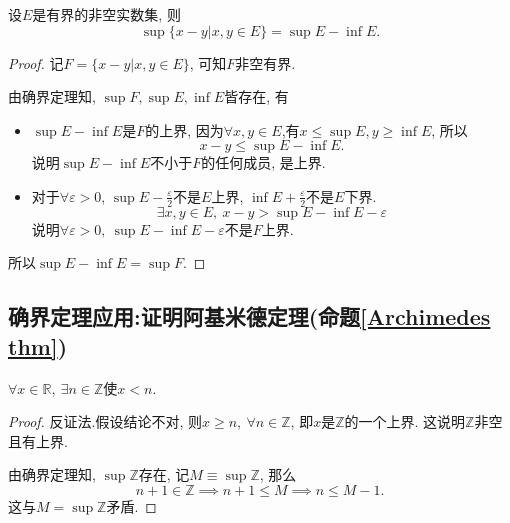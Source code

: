 \begin{example}
    设$E$是有界的非空实数集, 则
    \begin{equation}
      \sup \{x-y|x,y \in E\} = \sup E - \inf E.
    \end{equation}
\end{example}
\begin{proof}
    记$F = \{x-y|x,y \in  E\}$, 可知$F$非空有界.

    由确界定理知, $\sup F, \sup E, \inf E$皆存在, 有
    \begin{itemize}
        \item $\sup E - \inf E$是$F$的上界, 因为$\forall  x,y \in E$,有$x\le \sup E, y\ge \inf E$, 所以
        \begin{equation}
          x-y \le \sup E - \inf E.
        \end{equation}
        说明$\sup E - \inf E$不小于$F$的任何成员, 是上界.
        \item 对于$\forall \varepsilon > 0$, $\sup E - \frac{\varepsilon}{2}$不是$E$上界, $\inf E + \frac{\varepsilon}{2}$不是$E$下界.
        \begin{equation}
          \exists x,y\in E, \ x- y > \sup E - \inf E - \varepsilon
        \end{equation}
        说明$\forall \varepsilon> 0 , \ \sup E - \inf E - \varepsilon$不是$F$上界.
    \end{itemize}

    所以$\sup E - \inf E = \sup F$.
\end{proof}



\subsection[确界定理应用]{确界定理应用:证明阿基米德定理(命题\ref{Archimedes thm})}
\begin{proposition}\label{Archimedes thm}
    $\forall x \in \mathbb{R}, \ \exists n \in \mathbb{Z} \text{使} x<n$.
\end{proposition}
\begin{proof}
    反证法.假设结论不对, 则$x \ge n, \ \forall n \in  \mathbb{Z}$, 即$x$是$\mathbb{Z}$的一个上界. 这说明$\mathbb{Z}$非空且有上界.

    由确界定理知, $\sup \mathbb{Z}$存在, 记$M \equiv \sup \mathbb{Z}$, 那么
    \begin{equation}
      n+1 \in \mathbb{Z} \implies n + 1 \le  M \implies n\le M-1.
    \end{equation}
    这与$M = \sup \mathbb{Z}$矛盾.
\end{proof}



